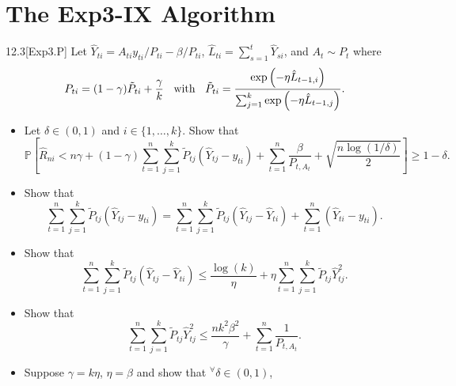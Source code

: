 \documentclass[10pt]{article}
\theoremstyle{definition}
\newenvironment{exercise*}[1]{%
  \IfBlankTF{#1}
    {\renewcommand{\themanualexerciseinner}{\unskip}}
    {\renewcommand\themanualexerciseinner{#1}}%
  \manualexerciseinner
}{\endmanualexerciseinner}
\begin{document}
\section{The Exp3-IX Algorithm}

\begin{exercise*}{12.3}[Exp3.P]
    Let $\hat{Y}_{ti} = A_{ti}y_{ti}/P_{ti} - \beta / P_{ti}$, $\hat{L}_{ti} = \sum_{s=1}^t \hat{Y}_{si}$, and $A_t \sim P_t$ where
    \begin{equation*}
        P_{ti} = (1-\gamma)\tilde{P}_{ti} + \frac{\gamma}{k} \hspace{0.2cm} \text{ with } \hspace{0.2cm} \tilde{P}_{ti} = \frac{\exp\left(-\eta\hat{L}_{t-1,i}\right)}{\sum_{j=1}^k\exp\left(-\eta\hat{L}_{t-1,j}\right)}.
    \end{equation*}
    \begin{itemize}
        \item[(a)] Let $\delta \in (0,1)$ and $i \in \{1, \ldots, k\}$. Show that
        \begin{equation*}
            \mathbb{P}\left[\hat{R}_{ni} < n\gamma + (1-\gamma)\sum_{t=1}^n \sum_{j=1}^k \tilde{P}_{tj}(\hat{Y}_{tj} - y_{ti}) + \sum_{t=1}^n \frac{\beta}{P_{t,A_t}} + \sqrt{\frac{n \log(1/\delta)}{2}}\right] \geq 1-\delta.
        \end{equation*}
        \item[(b)] Show that
        \begin{equation*}
            \sum_{t=1}^n \sum_{j=1}^k \tilde{P}_{tj}(\hat{Y}_{tj} - y_{ti}) = \sum_{t=1}^n \sum_{j=1}^k \tilde{P}_{tj}(\hat{Y}_{tj} - \hat{Y}_{ti}) + \sum_{t=1}^n(\hat{Y}_{ti} - y_{ti}).
        \end{equation*}
        \item[(c)] Show that
        \begin{equation*}
            \sum_{t=1}^n \sum_{j=1}^k \tilde{P}_{tj}(\hat{Y}_{tj} - \hat{Y}_{ti}) \leq \frac{\log(k)}{\eta} + \eta \sum_{t=1}^n \sum_{j=1}^k \tilde{P}_{tj}\hat{Y}_{tj}^2.
        \end{equation*}
        \item[(d)] Show that
        \begin{equation*}
            \sum_{t=1}^n \sum_{j=1}^k \tilde{P}_{tj}\hat{Y}_{tj}^2 \leq \frac{n k^2 \beta^2}{\gamma} + \sum_{t=1}^n \frac{1}{P_{t, A_t}}.
        \end{equation*}
        \item[(e)] Suppose $\gamma = k\eta$, $\eta = \beta$ and show that $^\forall \delta \in (0,1)$,

\end{itemize}
\end{exercise*}
\end{document}
